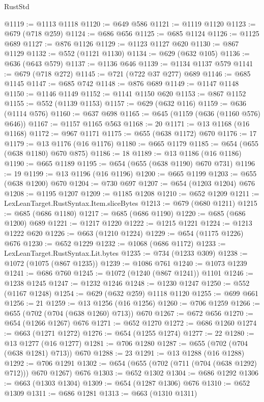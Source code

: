 \begin{lexlean}{RustStd}
\begin{coremodule}
{\begin{coremodule}
{{{{{{{{{{{{{{{@1119 := @1113 @1118
@1120 := @649 @586
@1121 := @1119 @1120
@1123 := @679 (@718 @259)
@1124 := @686 @656
@1125 := @685 @1124
@1126 := @1125 @689
@1127 := @876 @1126
@1129 := @1123 @1127 @620
@1130 := @867 @1129
@1132 := @552 (@1121 @1130)
@1134 := @629 (@632 @105)
@1136 := @636 (@643 @579)
@1137 := @1136 @646
@1139 := @1134 @1137 @579
@1141 := @679 (@718 @272)
@1145 := @721 (@722 @37 @277) @689
@1146 := @685 @1145
@1147 := @685 @742
@1148 := @876 @689
@1149 := @1147 @1148
@1150 := @1146 @1149
@1152 := @1141 @1150 @620
@1153 := @867 @1152
@1155 := @552 (@1139 @1153)
@1157 := @629 (@632 @116)
@1159 := @636 (@1114 @576)
@1160 := @637 @698
@1165 := @645 (@1159 (@636 (@1160 @576) @646))
@1167 := @1157 @1165 @563
@1168 := 20
@1171 := @13 @1168 (@16 @1168)
@1172 := @967 @1171
@1175 := @655 (@638 @1172) @670
@1176 := 17
@1179 := @13 @1176 (@16 @1176)
@1180 := @665 @1179
@1185 := @654 (@655 (@638 @1180) @670 @875)
@1186 := 18
@1189 := @13 @1186 (@16 @1186)
@1190 := @665 @1189
@1195 := @654 (@655 (@638 @1190) @670 @731)
@1196 := 19
@1199 := @13 @1196 (@16 @1196)
@1200 := @665 @1199
@1203 := @655 (@638 @1200) @670
@1204 := @730 @697
@1207 := @654 (@1203 @1204) @676
@1208 := @1195 @1207
@1209 := @1185 @1208
@1210 := @652 @1209
@1211 := LexLeanTarget.RustSyntax.Item.sliceBytes
@1213 := @679 (@680 @1211)
@1215 := @685 (@686 @1180)
@1217 := @685 (@686 @1190)
@1220 := @685 (@686 @1200) @689
@1221 := @1217 @1220
@1222 := @1215 @1221
@1224 := @1213 @1222 @620
@1226 := @663 (@1210 @1224)
@1229 := @654 (@1175 @1226) @676
@1230 := @652 @1229
@1232 := @1068 (@686 @1172)
@1233 := LexLeanTarget.RustSyntax.Lit.bytes
@1235 := @734 (@1233 @309)
@1238 := @1072 (@1075 (@867 @1235))
@1239 := @1086 @761
@1240 := @1073 @1239
@1241 := @686 @760
@1245 := @1072 (@1240 (@867 @1241)) @1101
@1246 := @1238 @1245
@1247 := @1232 @1246
@1248 := @1230 @1247
@1250 := @552 (@1167 @1248)
@1254 := @629 (@632 @259) @1118 @1120
@1255 := @699 @661
@1256 := 21
@1259 := @13 @1256 (@16 @1256)
@1260 := @706 @1259
@1266 := @655 (@702 (@704 (@638 @1260) @713)) @670
@1267 := @672 @656
@1270 := @654 (@1266 @1267) @676
@1271 := @652 @1270
@1272 := @686 @1260
@1274 := @663 (@1271 @1272)
@1276 := @654 (@1255 @1274)
@1277 := 22
@1280 := @13 @1277 (@16 @1277)
@1281 := @706 @1280
@1287 := @655 (@702 (@704 (@638 @1281) @713)) @670
@1288 := 23
@1291 := @13 @1288 (@16 @1288)
@1292 := @706 @1291
@1302 := @654 (@655 (@702 (@711 (@704 (@638 @1292) @712))) @670 @1267) @676
@1303 := @652 @1302
@1304 := @686 @1292
@1306 := @663 (@1303 @1304)
@1309 := @654 (@1287 @1306) @676
@1310 := @652 @1309
@1311 := @686 @1281
@1313 := @663 (@1310 @1311)
}}}}}}}}}}}}}}}
\end{coremodule}}
\end{coremodule}
\end{lexlean}
